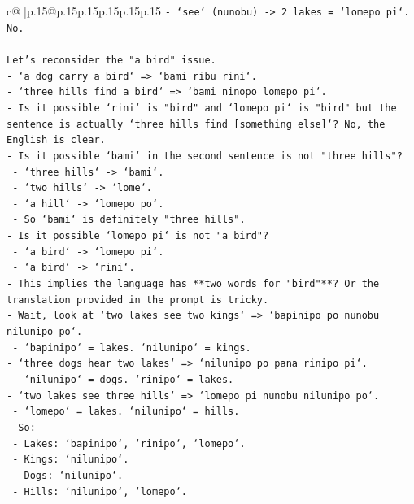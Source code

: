 \documentclass{article}
\begin{document}
{\begin{supertabular}{c@{$\;$}|p{.15\linewidth}@{}p{.15\linewidth}p{.15\linewidth}p{.15\linewidth}p{.15\linewidth}p{.15\linewidth}}
{{{\texttt{{-} `see` (nunobu) {-}> 2 lakes = `lomepo pi`.} \\
\texttt{No.} \\
\\ 
\texttt{Let's reconsider the "a bird" issue.} \\
\texttt{{-} `a dog carry a bird` => `bami ribu rini`.} \\
\texttt{{-} `three hills find a bird` => `bami ninopo lomepo pi`.} \\
\texttt{{-} Is it possible `rini` is "bird" and `lomepo pi` is "bird" but the sentence is actually `three hills find {[}something else{]}`? No, the English is clear.} \\
\texttt{{-} Is it possible `bami` in the second sentence is not "three hills"?} \\
\texttt{  {-} `three hills` {-}> `bami`.} \\
\texttt{  {-} `two hills` {-}> `lome`.} \\
\texttt{  {-} `a hill` {-}> `lomepo po`.} \\
\texttt{  {-} So `bami` is definitely "three hills".} \\
\texttt{{-} Is it possible `lomepo pi` is not "a bird"?} \\
\texttt{  {-} `a bird` {-}> `lomepo pi`.} \\
\texttt{  {-} `a bird` {-}> `rini`.} \\
\texttt{{-} This implies the language has **two words for "bird"**? Or the translation provided in the prompt is tricky.} \\
\texttt{{-} Wait, look at `two lakes see two kings` => `bapinipo po nunobu nilunipo po`.} \\
\texttt{  {-} `bapinipo` = lakes. `nilunipo` = kings.} \\
\texttt{{-} `three dogs hear two lakes` => `nilunipo po pana rinipo pi`.} \\
\texttt{  {-} `nilunipo` = dogs. `rinipo` = lakes.} \\
\texttt{{-} `two lakes see three hills` => `lomepo pi nunobu nilunipo po`.} \\
\texttt{  {-} `lomepo` = lakes. `nilunipo` = hills.} \\
\texttt{{-} So:} \\
\texttt{  {-} Lakes: `bapinipo`, `rinipo`, `lomepo`.} \\
\texttt{  {-} Kings: `nilunipo`.} \\
\texttt{  {-} Dogs: `nilunipo`.} \\
\texttt{  {-} Hills: `nilunipo`, `lomepo`.} \\
}}}
\end{supertabular}}
\end{document}

